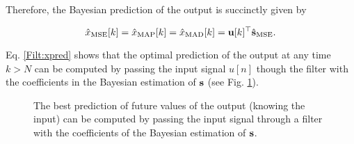 Therefore, the Bayesian prediction of the output is succinctly given by
%
\begin{framed}
\begin{equation}
\hat{x}_{\text{MSE} }[k] = \hat{x}_{\text{MAP} }[k] 
                         = \hat{x}_{\text{MAD} }[k]
                         = {\mathbf u}[k]^\top\hat{{\mathbf s}}_\text{MSE}.
\label{Filt:xpred}
\end{equation}
\end{framed}

Eq. \eqref{Filt:xpred} shows that the optimal prediction of the output at any time $k>N$ can be computed by passing the input signal $u[n]$ though the filter with the coefficients in the Bayesian estimation of ${\mathbf s}$ (see Fig. \ref{fig:linear_filter2}).

\begin{figure}[htb]  %
    \centering
\caption{The best prediction of future values of the output (knowing the input) can be computed by passing the input signal through a filter with the coefficients of the Bayesian estimation of ${\mathbf s}$.}
\label{fig:linear_filter2}
\end{figure}





